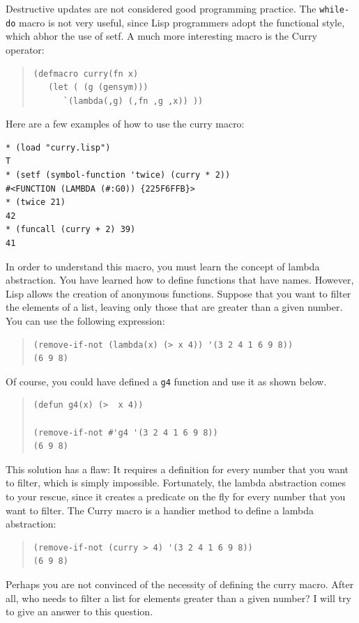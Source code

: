 \documentclass[a4paper,12pt]{book}
\begin{document}
Destructive updates are not considered good programming practice.
The \verb|while-do| macro is not very useful, since Lisp programmers adopt the functional style, which abhor the use of setf.
A much more interesting macro is the Curry operator:
\begin{quote}\label{page:lambda2}
\begin{verbatim}
(defmacro curry(fn x)
   (let ( (g (gensym)))
      `(lambda(,g) (,fn ,g ,x)) ))
\end{verbatim}
\end{quote}
Here are a few examples of how to use the curry macro:
\begin{verbatim}
* (load "curry.lisp")
T
* (setf (symbol-function 'twice) (curry * 2))
#<FUNCTION (LAMBDA (#:G0)) {225F6FFB}>
* (twice 21)
42
* (funcall (curry + 2) 39)
41
\end{verbatim}
In order to understand this macro, you must learn the concept
of lambda abstraction. You have learned how to define functions
that have names. However, Lisp allows the creation of anonymous functions. Suppose that you want to filter the elements of a list, leaving only those that are greater than a given number.
You can use the following expression:
\begin{quote}
\begin{verbatim}
(remove-if-not (lambda(x) (> x 4)) '(3 2 4 1 6 9 8))
(6 9 8)
\end{verbatim}
\end{quote}
Of course, you could have defined a \verb|g4| function
and use it as shown below.
\begin{quote}
\begin{verbatim}
(defun g4(x) (>  x 4))

(remove-if-not #'g4 '(3 2 4 1 6 9 8))
(6 9 8)
\end{verbatim}
\end{quote}
This solution has a flaw: It requires a
definition for every number that you
want to filter, which is simply impossible.
Fortunately, the lambda abstraction comes
to your rescue, since it 
creates a predicate on the fly for every
number that you want to filter. The Curry
macro is a handier method to define a lambda
abstraction:
\begin{quote}
\begin{verbatim}
(remove-if-not (curry > 4) '(3 2 4 1 6 9 8))
(6 9 8)
\end{verbatim}
\end{quote}

Perhaps you are not convinced of the
necessity of defining the curry macro.
After all, who  needs to filter a list
for elements greater than a given number?
I will try to give an answer to this
question.
\end{document}
